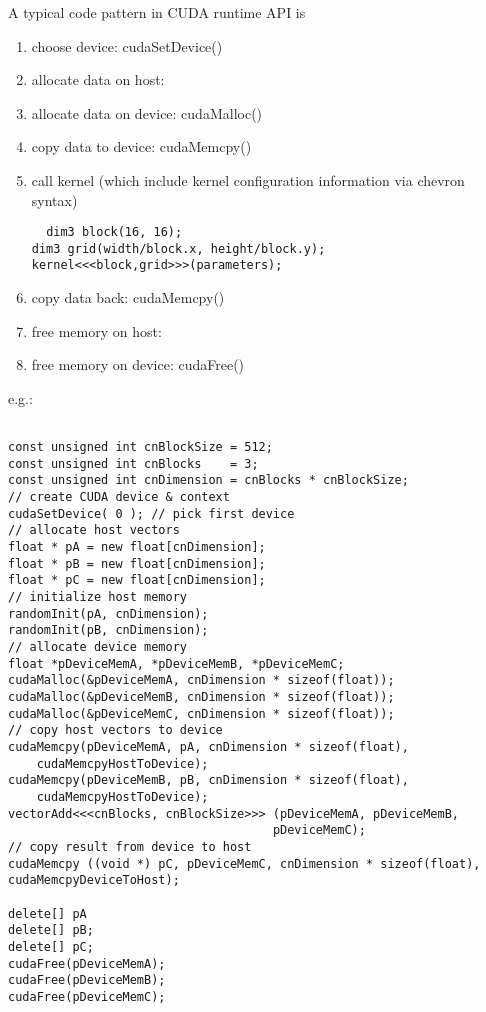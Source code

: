 A typical code pattern in CUDA runtime API is 
\begin{enumerate}
  \item choose device: cudaSetDevice()
  \item allocate data on host:
  \item allocate data on device: cudaMalloc()
  \item copy data to device: cudaMemcpy()
  \item call kernel (which include kernel configuration information via chevron
  syntax)
  \begin{lstlisting}
  dim3 block(16, 16);
dim3 grid(width/block.x, height/block.y);
kernel<<<block,grid>>>(parameters);
  \end{lstlisting}
  \item copy data back: cudaMemcpy()
  \item free memory on host:
  \item free memory on device:  cudaFree()
\end{enumerate}
e.g.:
\begin{lstlisting}

const unsigned int cnBlockSize = 512;
const unsigned int cnBlocks    = 3;
const unsigned int cnDimension = cnBlocks * cnBlockSize;
// create CUDA device & context
cudaSetDevice( 0 ); // pick first device
// allocate host vectors
float * pA = new float[cnDimension];
float * pB = new float[cnDimension];
float * pC = new float[cnDimension];
// initialize host memory
randomInit(pA, cnDimension);
randomInit(pB, cnDimension);
// allocate device memory
float *pDeviceMemA, *pDeviceMemB, *pDeviceMemC;
cudaMalloc(&pDeviceMemA, cnDimension * sizeof(float));
cudaMalloc(&pDeviceMemB, cnDimension * sizeof(float));
cudaMalloc(&pDeviceMemC, cnDimension * sizeof(float));
// copy host vectors to device
cudaMemcpy(pDeviceMemA, pA, cnDimension * sizeof(float), 
    cudaMemcpyHostToDevice);
cudaMemcpy(pDeviceMemB, pB, cnDimension * sizeof(float),
    cudaMemcpyHostToDevice);
vectorAdd<<<cnBlocks, cnBlockSize>>> (pDeviceMemA, pDeviceMemB,
                                     pDeviceMemC);
// copy result from device to host
cudaMemcpy ((void *) pC, pDeviceMemC, cnDimension * sizeof(float),
cudaMemcpyDeviceToHost);

delete[] pA
delete[] pB;
delete[] pC;
cudaFree(pDeviceMemA);
cudaFree(pDeviceMemB);
cudaFree(pDeviceMemC);
\end{lstlisting}

